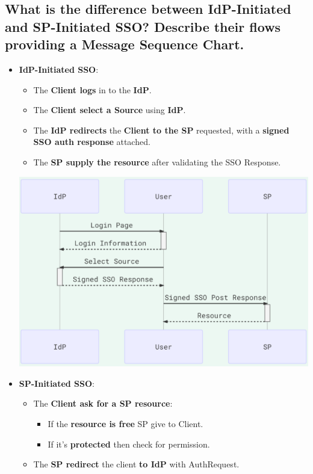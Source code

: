 \documentclass[9pt, letterpaper]{article}
\begin{document}
\subsection{What is the difference between IdP-Initiated and SP-Initiated SSO? Describe their flows providing a Message Sequence Chart.}
\begin{itemize}
	\item \textbf{IdP-Initiated SSO}: 
	\begin{itemize}
		\item The \textbf{Client logs} in to the \textbf{IdP}.
		\item The \textbf{Client select a Source} using \textbf{IdP}.
		\item The \textbf{IdP redirects} the \textbf{Client to the SP} requested, with a \textbf{signed SSO auth response} attached.
		\item The \textbf{SP supply the resource} after validating the SSO Response.
	\end{itemize}
	\begin{center}
		\includegraphics[scale=0.6]{SSO_IDP.png}
	\end{center}
	\newpage
	\item \textbf{SP-Initiated SSO}:
	\begin{itemize}
		\item The \textbf{Client ask for a SP resource}:
		\begin{itemize}
			\item If the \textbf{resource is free} SP give to Client.
			\item If it's \textbf{protected} then check for permission.
		\end{itemize}
		\item The \textbf{SP redirect} the client \textbf{to IdP} with AuthRequest.

\end{itemize}
\end{itemize}
\end{document}
